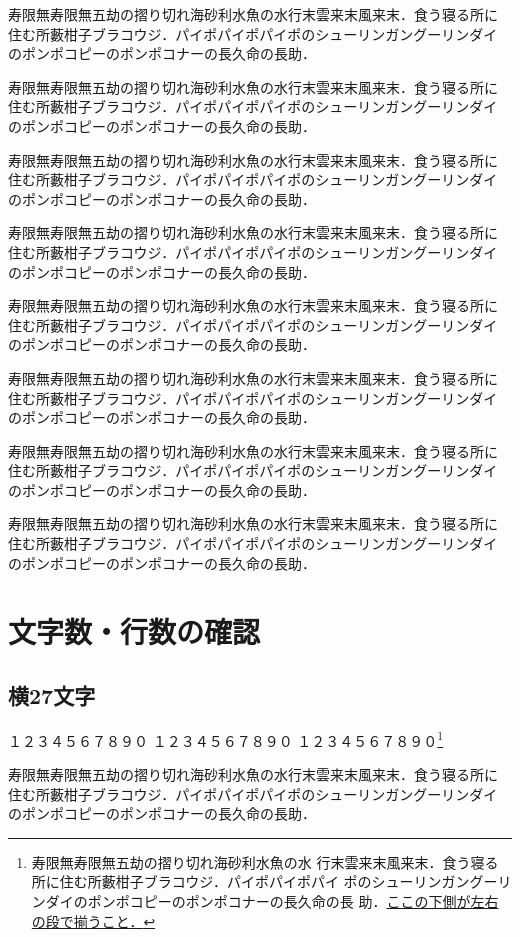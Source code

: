 \documentclass[a4j, 12Q, twocolumn, twoside]{jsarticle}
\begin{document}
寿限無寿限無五劫の摺り切れ海砂利水魚の水行末雲来末風来末．食う寝る所に
住む所藪柑子ブラコウジ．パイポパイポパイポのシューリンガングーリンダイ
のポンポコピーのポンポコナーの長久命の長助．

寿限無寿限無五劫の摺り切れ海砂利水魚の水行末雲来末風来末．食う寝る所に
住む所藪柑子ブラコウジ．パイポパイポパイポのシューリンガングーリンダイ
のポンポコピーのポンポコナーの長久命の長助．

寿限無寿限無五劫の摺り切れ海砂利水魚の水行末雲来末風来末．食う寝る所に
住む所藪柑子ブラコウジ．パイポパイポパイポのシューリンガングーリンダイ
のポンポコピーのポンポコナーの長久命の長助．

寿限無寿限無五劫の摺り切れ海砂利水魚の水行末雲来末風来末．食う寝る所に
住む所藪柑子ブラコウジ．パイポパイポパイポのシューリンガングーリンダイ
のポンポコピーのポンポコナーの長久命の長助．

寿限無寿限無五劫の摺り切れ海砂利水魚の水行末雲来末風来末．食う寝る所に
住む所藪柑子ブラコウジ．パイポパイポパイポのシューリンガングーリンダイ
のポンポコピーのポンポコナーの長久命の長助．

寿限無寿限無五劫の摺り切れ海砂利水魚の水行末雲来末風来末．食う寝る所に
住む所藪柑子ブラコウジ．パイポパイポパイポのシューリンガングーリンダイ
のポンポコピーのポンポコナーの長久命の長助．

寿限無寿限無五劫の摺り切れ海砂利水魚の水行末雲来末風来末．食う寝る所に
住む所藪柑子ブラコウジ．パイポパイポパイポのシューリンガングーリンダイ
のポンポコピーのポンポコナーの長久命の長助．

寿限無寿限無五劫の摺り切れ海砂利水魚の水行末雲来末風来末．食う寝る所に
住む所藪柑子ブラコウジ．パイポパイポパイポのシューリンガングーリンダイ
のポンポコピーのポンポコナーの長久命の長助．

\clearpage
\section{文字数・行数の確認}
\subsection{横27文字}
\noindent
１２３４５６７８９０
１２３４５６７８９０
１２３４５６７８９０\footnote{寿限無寿限無五劫の摺り切れ海砂利水魚の水
行末雲来末風来末．食う寝る所に住む所藪柑子ブラコウジ．パイポパイポパイ
ポのシューリンガングーリンダイのポンポコピーのポンポコナーの長久命の長
助．\underline{ここの下側が左右の段で揃うこと．}}

寿限無寿限無五劫の摺り切れ海砂利水魚の水行末雲来末風来末．食う寝る所に
住む所藪柑子ブラコウジ．パイポパイポパイポのシューリンガングーリンダイ
のポンポコピーのポンポコナーの長久命の長助．
\end{document}
